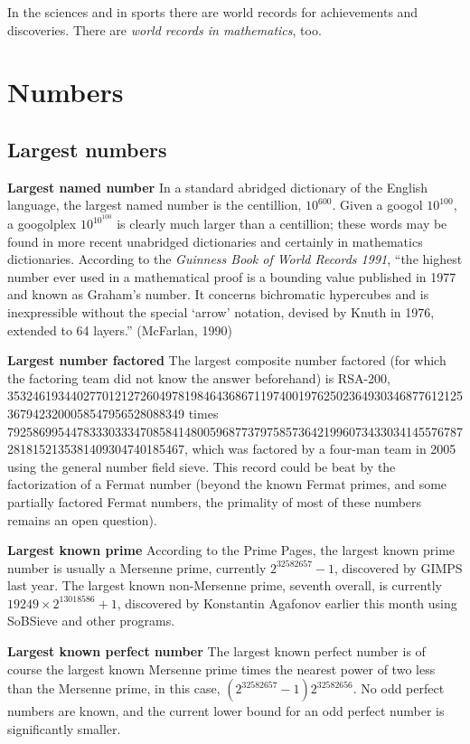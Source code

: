 \documentclass[12pt]{article}
\begin{document}
In the sciences and in sports there are world records for achievements and discoveries. There are {\em world records in mathematics}, too.

\section{Numbers}

\subsection{Largest numbers}

{\bf Largest named number} In a standard abridged dictionary of the  English language, the largest named number is the centillion, $10^{600}$. Given a googol $10^{100}$, a googolplex $10^{10^{100}}$ is clearly much larger than a centillion; these words may be found in more recent unabridged dictionaries and certainly in mathematics dictionaries. According to the {\it Guinness Book of World Records 1991}, ``the highest number ever used in a mathematical proof is a bounding value published in 1977 and known as Graham's number. It concerns bichromatic hypercubes and is inexpressible without the  special `arrow' notation, devised by Knuth in 1976, extended to 64 layers.'' (McFarlan, 1990)

{\bf Largest number factored} The largest composite number factored (for which the factoring team did not know the answer beforehand) is RSA-200, 3532461934402770121272604978198464368671197400197625023649303468776121253679423200058547956528088349 times 7925869954478333033347085841480059687737975857364219960734330341455767872818152135381409304740185467, which was factored by a four-man team in 2005 using the general number field sieve. This record could be beat by the factorization of a Fermat number (beyond the known Fermat primes, and some partially factored Fermat numbers, the primality of most of these numbers remains an open question).

{\bf Largest known prime} According to the Prime Pages, the largest known prime number is usually a Mersenne prime, currently $2^{32582657} - 1$, discovered by GIMPS last year. The largest known non-Mersenne prime, seventh overall, is currently $19249 \times 2^{13018586} + 1$, discovered by Konstantin Agafonov earlier this month using SoBSieve and other programs.

{\bf Largest known perfect number} The largest known perfect number is of course the largest known Mersenne prime times the nearest power of two less than the Mersenne prime, in this case, $(2^{32582657} - 1)2^{32582656}$. No odd perfect numbers are known, and the current lower bound for an odd perfect number is significantly smaller.
\end{document}
